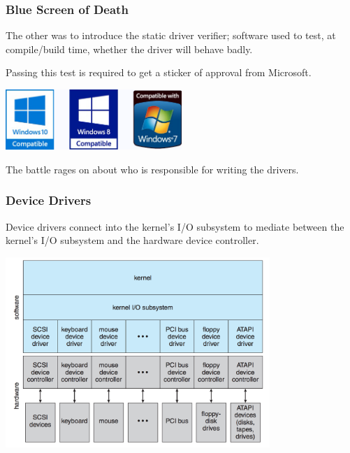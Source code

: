 \begin{frame}
\frametitle{Blue Screen of Death}

The other was to introduce the static driver verifier; software used to test, at compile/build time, whether the driver will behave badly. 

Passing this test is required to get a sticker of approval from Microsoft.

\begin{center}
	\includegraphics[width=0.5\textwidth]{images/wqhl.jpg}
\end{center}

The battle rages on about who is responsible for writing the drivers.


\end{frame}

\begin{frame}
\frametitle{Device Drivers}

Device drivers connect into the kernel's I/O subsystem to mediate between the kernel's I/O subsystem and the hardware device controller. 

\begin{center}
	\includegraphics[width=0.75\textwidth]{images/kernel-io-structure.png}
\end{center}


\end{frame}

